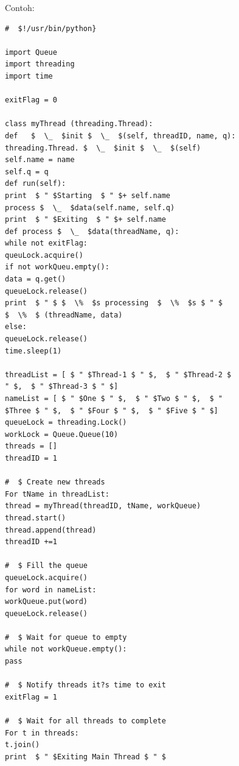 \vspace{12pt}
Contoh:  
\begin{verbatim}
#  $!/usr/bin/python}  

import Queue
import threading
import time

exitFlag = 0 

class myThread (threading.Thread): 
def   $  \_  $init $  \_  $(self, threadID, name, q):
threading.Thread. $  \_  $init $  \_  $(self) 
self.name = name
self.q = q
def run(self):
print  $ " $Starting  $ " $+ self.name
process $  \_  $data(self.name, self.q) 
print  $ " $Exiting  $ " $+ self.name 
def process $  \_  $data(threadName, q):
while not exitFlag:
queuLock.acquire()
if not workQueu.empty(): 
data = q.get() 
queueLock.release() 
print  $ " $ $  \%  $s processing  $  \%  $s $ " $ 
$  \%  $ (threadName, data) 
else: 
queueLock.release()
time.sleep(1) 

threadList = [ $ " $Thread-1 $ " $,  $ " $Thread-2 $
" $,  $ " $Thread-3 $ " $]
nameList = [ $ " $One $ " $,  $ " $Two $ " $,  $ "
$Three $ " $,  $ " $Four $ " $,  $ " $Five $ " $]
queueLock = threading.Lock()
workLock = Queue.Queue(10)
threads = [] 
threadID = 1 

#  $ Create new threads
For tName in threadList: 
thread = myThread(threadID, tName, workQueue)
thread.start()
thread.append(thread)
threadID +=1

#  $ Fill the queue 
queueLock.acquire() 
for word in nameList:
workQueue.put(word) 
queueLock.release()

#  $ Wait for queue to empty
while not workQueue.empty(): 
pass 

#  $ Notify threads it?s time to exit
exitFlag = 1

#  $ Wait for all threads to complete
For t in threads:
t.join()
print  $ " $Exiting Main Thread $ " $
\end{verbatim}

